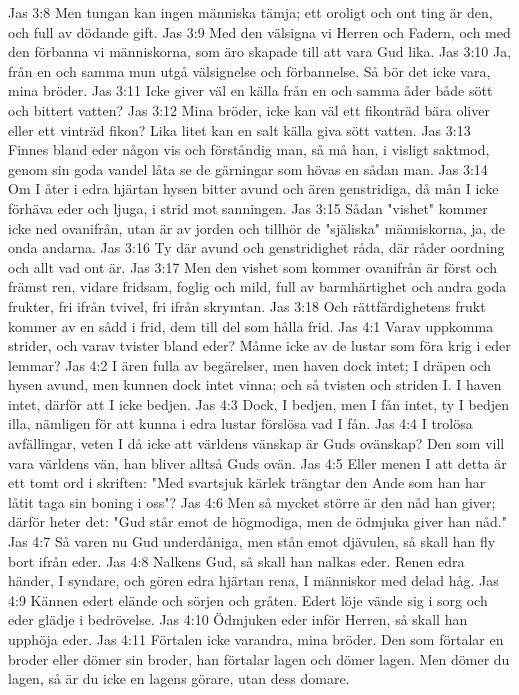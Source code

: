 Jas 3:8  Men tungan kan ingen människa tämja; ett oroligt och ont ting är den, och full av dödande gift.
Jas 3:9  Med den välsigna vi Herren och Fadern, och med den förbanna vi människorna, som äro skapade till att vara Gud lika.
Jas 3:10  Ja, från en och samma mun utgå välsignelse och förbannelse. Så bör det icke vara, mina bröder.
Jas 3:11  Icke giver väl en källa från en och samma åder både sött och bittert vatten?
Jas 3:12  Mina bröder, icke kan väl ett fikonträd bära oliver eller ett vinträd fikon? Lika litet kan en salt källa giva sött vatten.
Jas 3:13  Finnes bland eder någon vis och förståndig man, så må han, i visligt saktmod, genom sin goda vandel låta se de gärningar som hövas en sådan man.
Jas 3:14  Om I åter i edra hjärtan hysen bitter avund och ären genstridiga, då mån I icke förhäva eder och ljuga, i strid mot sanningen.
Jas 3:15  Sådan "vishet" kommer icke ned ovanifrån, utan är av jorden och tillhör de "själiska" människorna, ja, de onda andarna.
Jas 3:16  Ty där avund och genstridighet råda, där råder oordning och allt vad ont är.
Jas 3:17  Men den vishet som kommer ovanifrån är först och främst ren, vidare fridsam, foglig och mild, full av barmhärtighet och andra goda frukter, fri ifrån tvivel, fri ifrån skrymtan.
Jas 3:18  Och rättfärdighetens frukt kommer av en sådd i frid, dem till del som hålla frid.
Jas 4:1  Varav uppkomma strider, och varav tvister bland eder? Månne icke av de lustar som föra krig i eder lemmar?
Jas 4:2  I ären fulla av begärelser, men haven dock intet; I dräpen och hysen avund, men kunnen dock intet vinna; och så tvisten och striden I. I haven intet, därför att I icke bedjen.
Jas 4:3  Dock, I bedjen, men I fån intet, ty I bedjen illa, nämligen för att kunna i edra lustar förslösa vad I fån.
Jas 4:4  I trolösa avfällingar, veten I då icke att världens vänskap är Guds ovänskap? Den som vill vara världens vän, han bliver alltså Guds ovän.
Jas 4:5  Eller menen I att detta är ett tomt ord i skriften: "Med svartsjuk kärlek trängtar den Ande som han har låtit taga sin boning i oss"?
Jas 4:6  Men så mycket större är den nåd han giver; därför heter det: "Gud står emot de högmodiga, men de ödmjuka giver han nåd."
Jas 4:7  Så varen nu Gud underdåniga, men stån emot djävulen, så skall han fly bort ifrån eder.
Jas 4:8  Nalkens Gud, så skall han nalkas eder. Renen edra händer, I syndare, och gören edra hjärtan rena, I människor med delad håg.
Jas 4:9  Kännen edert elände och sörjen och gråten. Edert löje vände sig i sorg och eder glädje i bedrövelse.
Jas 4:10  Ödmjuken eder inför Herren, så skall han upphöja eder.
Jas 4:11  Förtalen icke varandra, mina bröder. Den som förtalar en broder eller dömer sin broder, han förtalar lagen och dömer lagen. Men dömer du lagen, så är du icke en lagens görare, utan dess domare.
